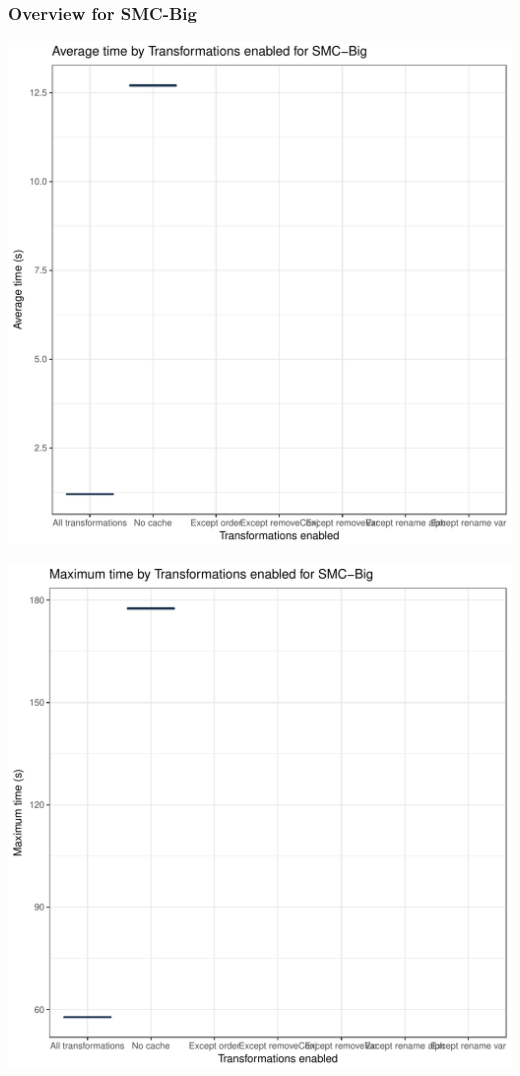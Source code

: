 \documentclass{article}\usepackage[]{graphicx}\usepackage[]{color}
\makeatletter
\def\maxwidth{ %
  \ifdim\Gin@nat@width>\linewidth
    \linewidth
  \else
    \Gin@nat@width
  \fi
}
\newenvironment{knitrout}{}{} %
\makeatother
\begin{document}
\subsubsection{Overview for SMC-Big}
\begin{knitrout}
\color{fgcolor}
\includegraphics[width=\maxwidth]{figure/big-1} 

\includegraphics[width=\maxwidth]{figure/big-2} 


\end{knitrout}
\end{document}

